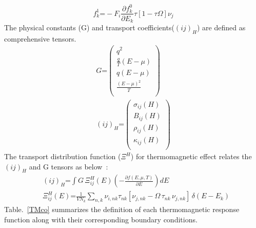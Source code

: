 \begin{equation}
f_{k}^{1}\textbf{=}-F_{i}\frac{\partial f_{k}^{0}}{\partial E_{k}}\tau [1-\tau \Omega]\nu _{j}
\label{eq5}
\end{equation}
The physical constants (G) and transport coefficients($(ij)_{H}$) are defined as comprehensive tensors. 
\begin{equation}
    \begin{split}
    G\textbf{=}\begin{pmatrix}
q^2 \\
\frac{q}{T}(E-\mu) \\
q(E-\mu) \\
\frac{(E-\mu)^2}{T} \\
\end{pmatrix} \\
(ij)_{H}\textbf{=}\begin{pmatrix}
\sigma_{ij}(H) \\
B_{ij}(H) \\
\rho _{ij}(H) \\
\kappa _{ij} (H) \\
\end{pmatrix} 
\label{eqmtrx}
    \end{split}
\end{equation}
The transport distribution function ($\Xi ^H$) for thermomagnetic effect relates the $(ij)_H$ and G tensors as below~\cite{rezaei2022crta,rezaei2023rta}:
\begin{equation}
    \begin{split}
        &(ij)_H\textbf{=}\int G \, \Xi_{ij}^H (E)\left(-\frac{\partial f(E,\mu,T)}{\partial E}\right) dE \\
     &\Xi_{ij}^H(E)\textbf{=}\frac{1}{VN_k}\sum_{n,k}\nu_{i,nk}\tau_{nk}[\nu_{j,nk}-\Omega\,\tau_{nk}\,\nu_{j,nk}]\,\delta(E-E_{k})
        \label{eq6}
    \end{split}
\end{equation}
Table.~\ref{TMco} summarizes the definition of each thermomagnetic response function along with their corresponding boundary conditions.
